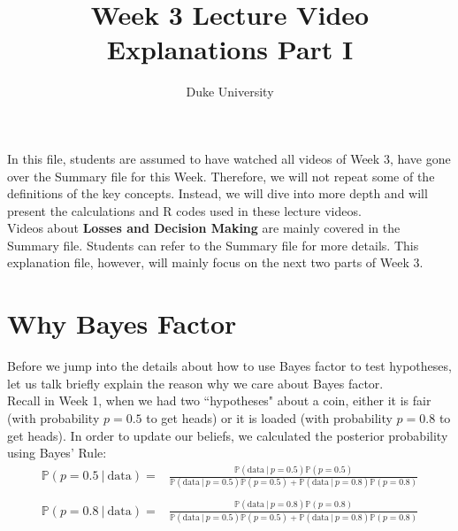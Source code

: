 \documentclass{article}
\begin{document}
\title{Week 3 Lecture Video Explanations Part I}
\author{Duke University}
\date{}
\maketitle 

In this file, students are assumed to have watched all videos of Week 3, have gone over the Summary file for this Week. Therefore, we will not repeat some of the definitions of the key concepts. Instead, we will dive into more depth and will present the calculations and R codes used in these lecture videos.\\

Videos about \textbf{Losses and Decision Making} are mainly covered in the Summary file. Students can refer to the Summary file for more details. This explanation file, however, will mainly focus on the next two parts of Week 3.

\section{Why Bayes Factor}

Before we jump into the details about how to use Bayes factor to test hypotheses, let us talk briefly explain the reason why we care about Bayes factor. \\

Recall in Week 1, when we had two ``hypotheses" about a coin, either it is fair (with probability $p=0.5$ to get heads) or it is loaded (with probability $p=0.8$ to get heads). In order to update our beliefs, we calculated the posterior probability using Bayes' Rule:
\begin{align*}
\mathbb{P}(p = 0.5~|~\text{data}) = &  \frac{\mathbb{P}(\text{data}~|~p=0.5)\mathbb{P}(p=0.5)}{\mathbb{P}(\text{data}~|~ p = 0.5)\mathbb{P}(p = 0.5) + \mathbb{P}(\text{data}~|~p = 0.8)\mathbb{P}(p = 0.8)} \\
& \\
\mathbb{P}(p = 0.8~|~\text{data}) = &  \frac{\mathbb{P}(\text{data}~|~p=0.8)\mathbb{P}(p=0.8)}{\mathbb{P}(\text{data}~|~ p = 0.5)\mathbb{P}(p = 0.5) + \mathbb{P}(\text{data}~|~p = 0.8)\mathbb{P}(p = 0.8)} 
\end{align*} 
\end{document}
